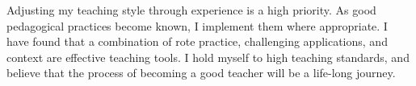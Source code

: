 \documentclass[a4paper,11pt]{article}
\begin{document}


Adjusting my teaching style through experience is a high priority. As good pedagogical practices become known, I implement them where appropriate. I have found that a combination of rote practice, challenging applications, and context are effective teaching tools. I hold myself to high teaching standards, and believe that the process of becoming a good teacher will be a life-long journey.

% 
 
\end{document}
